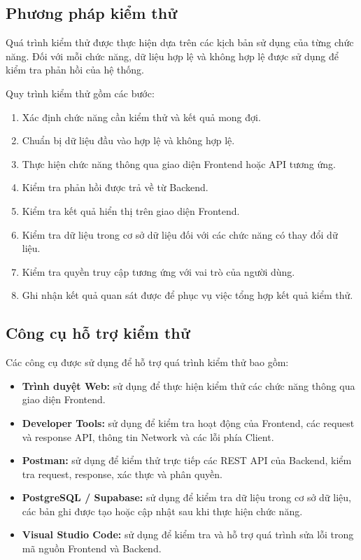 \subsection{Phương pháp kiểm thử}

Quá trình kiểm thử được thực hiện dựa trên các kịch bản sử dụng của từng chức năng. Đối với mỗi chức năng, dữ liệu hợp lệ và không hợp lệ được sử dụng để kiểm tra phản hồi của hệ thống.

Quy trình kiểm thử gồm các bước:

\begin{enumerate}
	\item Xác định chức năng cần kiểm thử và kết quả mong đợi.
	\item Chuẩn bị dữ liệu đầu vào hợp lệ và không hợp lệ.
	\item Thực hiện chức năng thông qua giao diện Frontend hoặc API tương ứng.
	\item Kiểm tra phản hồi được trả về từ Backend.
	\item Kiểm tra kết quả hiển thị trên giao diện Frontend.
	\item Kiểm tra dữ liệu trong cơ sở dữ liệu đối với các chức năng có thay đổi dữ liệu.
	\item Kiểm tra quyền truy cập tương ứng với vai trò của người dùng.
	\item Ghi nhận kết quả quan sát được để phục vụ việc tổng hợp kết quả kiểm thử.
\end{enumerate}

\subsection{Công cụ hỗ trợ kiểm thử}

Các công cụ được sử dụng để hỗ trợ quá trình kiểm thử bao gồm:

\begin{itemize}
	\item \textbf{Trình duyệt Web:} sử dụng để thực hiện kiểm thử các chức năng thông qua giao diện Frontend.
	
	\item \textbf{Developer Tools:} sử dụng để kiểm tra hoạt động của Frontend, các request và response API, thông tin Network và các lỗi phía Client.
	
	\item \textbf{Postman:} sử dụng để kiểm thử trực tiếp các REST API của Backend, kiểm tra request, response, xác thực và phân quyền.
	
	\item \textbf{PostgreSQL / Supabase:} sử dụng để kiểm tra dữ liệu trong cơ sở dữ liệu, các bản ghi được tạo hoặc cập nhật sau khi thực hiện chức năng.
	
	\item \textbf{Visual Studio Code:} sử dụng để kiểm tra và hỗ trợ quá trình sửa lỗi trong mã nguồn Frontend và Backend.
\end{itemize}



